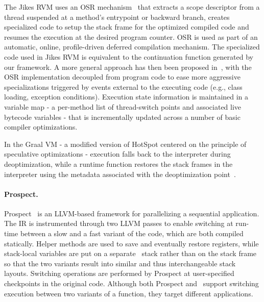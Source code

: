 
The Jikes RVM uses an OSR mechanism~\cite{Fink03} that extracts a scope descriptor from a thread suspended at a method's entrypoint or backward branch, creates specialized code to setup the stack frame for the optimized compiled code and resumes the execution at the desired program counter.
OSR is used as part of an automatic, online, profile-driven deferred compilation mechanism. The specialized code used in Jikes RVM is equivalent to the continuation function generated by our framework. %
A more general approach has then been proposed in~\cite{Soman06}, with the OSR implementation decoupled from program code to ease more aggressive specializations triggered by events external to the executing code (e.g., class loading, exception conditions). Execution state information is maintained in a variable map - a per-method list of thread-switch points and associated live bytecode variables - that is incrementally updated across a number of basic compiler optimizations. %

In the Graal VM - a modified version of HotSpot centered on the principle of speculative optimizations - execution falls back to the interpreter during deoptimization, while a runtime function restores the stack frames in the interpreter using the metadata associated with the deoptimization point~\cite{Duboscq13,Wurthinger13,Duboscq14}.

\paragraph*{Prospect.} Prospect~\cite{Susskraut10} is an LLVM-based framework for parallelizing a sequential application. The IR is instrumented through two LLVM passes to enable switching at run-time between a slow and a fast variant of the code, which are both compiled statically. Helper methods are used to save and eventually restore registers, while stack-local variables are put on a separate \alloca\ stack rather than on the stack frame so that the two variants result into similar and thus interchangeable stack layouts.
Switching operations are performed by Prospect at user-specified checkpoints in the original code. Although both Prospect and \osrkit\ support switching execution between two variants of a function, they target different applications.

